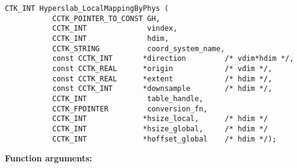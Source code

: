 \documentclass{article}
\begin{document}
\begin{verbatim}
CTK_INT Hyperslab_LocalMappingByPhys (
           CCTK_POINTER_TO_CONST GH,
           CCTK_INT              vindex,
           CCTK_INT              hdim,
           CCTK_STRING           coord_system_name,
           const CCTK_INT       *direction         /* vdim*hdim */,
           const CCTK_REAL      *origin            /* vdim */,
           const CCTK_REAL      *extent            /* hdim */,
           const CCTK_INT       *downsample        /* hdim */,
           CCTK_INT              table_handle,
           CCTK_FPOINTER         conversion_fn,
           CCTK_INT             *hsize_local,      /* hdim */
           CCTK_INT             *hsize_global,     /* hdim */
           CCTK_INT             *hoffset_global    /* hdim */);
\end{verbatim}

{\bf Function arguments:}
\end{document}
